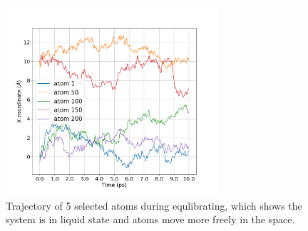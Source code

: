 \begin{figure}[!htbp]
	\begin{center}
		\includegraphics[width=0.7\textwidth]{figs/task4-positions.png} 
		\caption{Trajectory of 5 selected atoms during equlibrating, which shows the system is in liquid state and atoms move more freely in the space.}
		\label{fig4-4}
	\end{center}
\end{figure}

